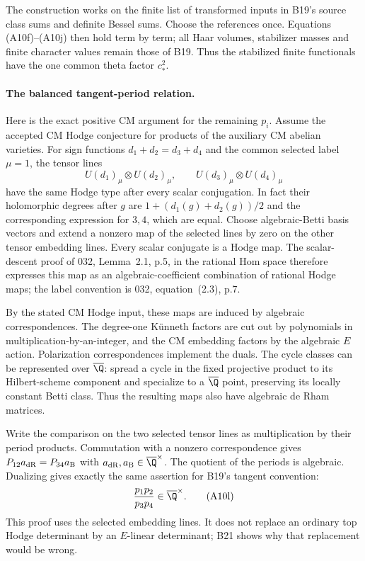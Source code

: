 The construction works on the finite list of transformed
inputs in B19's source class sums and definite Bessel sums.
Choose the references once.  Equations (A10f)--(A10j) then
hold term by term; all Haar volumes, stabilizer masses and
finite character values remain those of B19.  Thus the
stabilized finite functionals have the one common theta
factor $c_*^2$.

\paragraph{The balanced tangent-period relation.}
Here is the exact positive CM argument for the remaining
$p_i$.  Assume the accepted CM Hodge conjecture for products
of the auxiliary CM abelian varieties.  For sign functions
$d_1+d_2=d_3+d_4$ and the common selected label $\mu=1$,
the tensor lines
\[
 U(d_1)_\mu\otimes U(d_2)_\mu,
 \qquad
 U(d_3)_\mu\otimes U(d_4)_\mu
 \tag{A10k}
\]
have the same Hodge type after every scalar conjugation.
In fact their holomorphic degrees after $g$ are
$1+(d_1(g)+d_2(g))/2$ and the corresponding expression for
$3,4$, which are equal.  Choose algebraic-Betti basis
vectors and extend a nonzero map of the selected lines by
zero on the other tensor embedding lines.  Every scalar
conjugate is a Hodge map.  The scalar-descent proof of 032,
Lemma~2.1, p.5, in the rational Hom space therefore expresses
this map as an algebraic-coefficient combination of rational
Hodge maps; the label convention is 032, equation~(2.3), p.7.

By the stated CM Hodge input, these maps are induced by
algebraic correspondences.  The degree-one K\"unneth factors
are cut out by polynomials in multiplication-by-an-integer,
and the CM embedding factors by the algebraic $E$ action.
Polarization correspondences implement the duals.  The cycle
classes can be represented over $\overline\Q$: spread a
cycle in the fixed projective product to its Hilbert-scheme
component and specialize to a $\overline\Q$ point, preserving
its locally constant Betti class.  Thus the resulting maps
also have algebraic de Rham matrices.

Write the comparison on the two selected tensor lines as
multiplication by their period products.  Commutation with
a nonzero correspondence gives
$P_{12}a_{\rm dR}=P_{34}a_{\rm B}$ with
$a_{\rm dR},a_{\rm B}\in\overline\Q^\times$.
The quotient of the periods is algebraic.  Dualizing gives
exactly the same assertion for B19's tangent convention:
\[
                         \frac{p_1p_2}{p_3p_4}
                                  \in\overline\Q^\times.
 \tag{A10l}
\]
This proof uses the selected embedding lines.  It does not
replace an ordinary top Hodge determinant by an $E$-linear
determinant; B21 shows why that replacement would be wrong.

